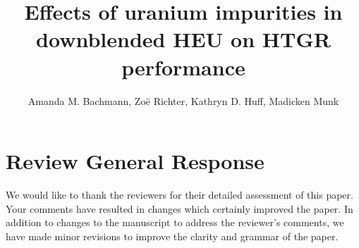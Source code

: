 \documentclass[answers,11pt]{exam}
\begin{document}



\title{Effects of uranium impurities in downblended HEU on
HTGR performance}


%

\author{Amanda M. Bachmann, 
Zo\"{e} Richter,
Kathryn D. Huff,
Madicken Munk}



%
\maketitle
\section*{Review General Response}
We would like to thank the reviewers for their detailed assessment of this
paper. Your comments have resulted in changes which certainly improved the
paper. In addition to changes to the manuscript to address the reviewer's
comments, we have made minor revisions to improve the clarity and grammar of the 
paper. 
\end{document}
